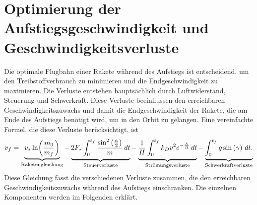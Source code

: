 %
%
%
%

\section{Optimierung der Aufstiegsgeschwindigkeit und Geschwindigkeitsverluste \label{leo:section:aufstiegsgleichung}}

Die optimale Flugbahn einer Rakete während des Aufstiegs ist
entscheidend, um den Treibstoffverbrauch zu minimieren und die
Endgeschwindigkeit zu maximieren.
Die Verluste entstehen hauptsächlich durch Luftwiderstand, Steuerung
und Schwerkraft.
Diese Verluste beeinflussen den erreichbaren Geschwindigkeitszuwachs
und damit die Endgeschwindigkeit der Rakete, die am Ende des Aufstiegs
benötigt wird, um in den Orbit zu gelangen.
%
Eine vereinfachte Formel, die diese Verluste berücksichtigt, ist
\begin{equation}
v_f
=
\underbrace{v_* \ln \biggl(\frac{m_0}{m_f}\biggr)}_{\text{Raketengleichung}} 
-
\underbrace{2F_*
\int_{0\mathstrut}^{t_f} \frac{\sin^2\left(\frac{\alpha}{2}\right)}{m} \, dt
}_{\text{Steuerverluste}}
-
\underbrace{\frac{1}{H}
\int_{0\mathstrut}^{t_f} k_Dv^2 e^{-\frac{h}{H}} \, dt
}_{\text{Strömungsverluste}}
-
\underbrace{
\int_{0\mathstrut}^{t_f} g \sin \left(\gamma\right) \, dt.
}_{\text{Schwerkraftverluste}}
\label{leo:aufstiegsgleichung}
\end{equation}
Diese Gleichung fasst die verschiedenen Verluste zusammen, die den erreichbaren Geschwindigkeitszuwachs während des Aufstiegs einschränken. 
Die einzelnen Komponenten werden im Folgenden erklärt.

